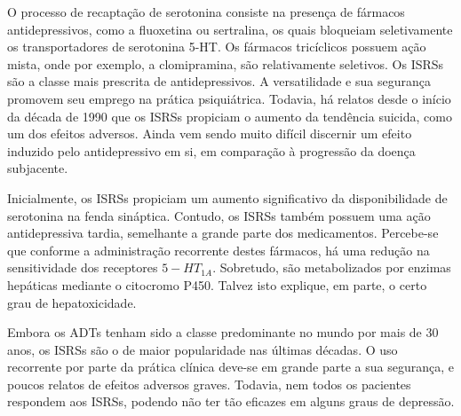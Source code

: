 O processo de recaptação de serotonina consiste na presença de fármacos antidepressivos, como a fluoxetina ou sertralina, os quais bloqueiam seletivamente os transportadores de serotonina 5-HT. Os fármacos tricíclicos possuem ação mista, onde por exemplo, a clomipramina, são relativamente seletivos. \cite{Kandel} Os ISRSs são a classe mais prescrita de antidepressivos. A versatilidade e sua segurança promovem seu emprego na prática psiquiátrica. Todavia, há relatos desde o início da década de 1990 que os ISRSs propiciam o aumento da tendência suicida, como um dos efeitos adversos. Ainda vem sendo muito difícil discernir um efeito induzido pelo antidepressivo em si, em comparação à progressão da doença subjacente. \cite{Schatzberg2015}

Inicialmente, os ISRSs propiciam um aumento significativo da disponibilidade de serotonina na fenda sináptica. Contudo, os ISRSs também possuem uma ação antidepressiva tardia, semelhante a grande parte dos medicamentos. Percebe-se que conforme a administração recorrente destes fármacos, há uma redução na sensitividade dos receptores $5-HT_{1A}$. Sobretudo, são metabolizados por enzimas hepáticas mediante o citocromo P450. Talvez isto explique, em parte, o certo grau de hepatoxicidade. \cite{Schatzberg2015}

Embora os ADTs tenham sido a classe predominante no mundo por mais de 30 anos, os ISRSs são o de maior popularidade nas últimas décadas. O uso recorrente por parte da prática clínica deve-se em grande parte a sua segurança, e poucos relatos de efeitos adversos graves. Todavia, nem todos os pacientes respondem aos ISRSs, podendo não ter tão eficazes em alguns graus de depressão. \cite{Schatzberg2015} 

